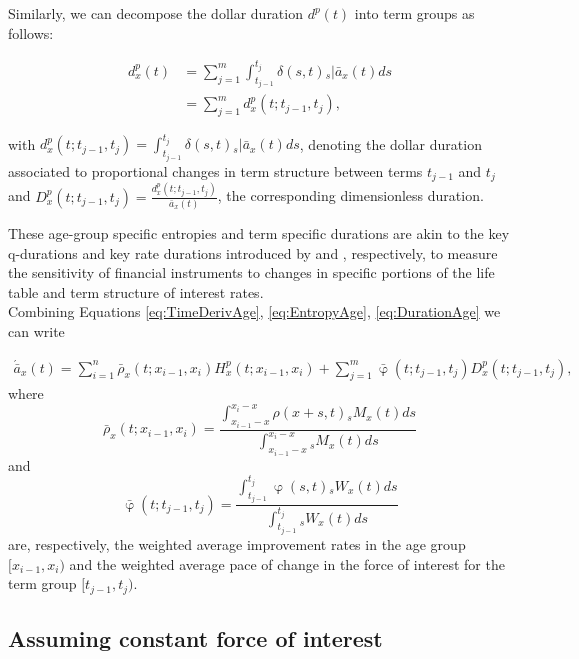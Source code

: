 \documentclass[12pt]{article}
\begin{document}
Similarly, we can decompose the dollar duration $d^p(t)$ into term groups as follows:

\begin{equation}\label{eq:DurationAge}
\begin{split}
{d}^{p}_{x}(t) &= \sum_{j=1}^m\int_{t_{j-1}}^{t_j} \delta(s,t) {}_s|\bar{a}_x(t)ds \\
&= \sum_{j=1}^m {d}^{p}_{x}(t;t_{j-1},t_{j}),
\end{split}
\end{equation}

with ${d}^{p}_{x}(t;t_{j-1},t_{j}) = \int_{t_{j-1}}^{t_j} \delta(s,t) {}_s|\bar{a}_x(t)ds$, denoting the dollar duration associated to proportional changes in term structure between terms $t_{j-1}$ and $t_{j}$ and ${D}^{p}_{x}(t;t_{j-1},t_{j}) = \frac{{d}^{p}_{x}(t;t_{j-1},t_{j})}{\bar{a}_x(t)}$, the corresponding dimensionless duration. 

These age-group specific entropies and term specific durations are akin to the key q-durations and key rate durations introduced by \citep{li2012key} and \citep{Ho1992}, respectively, to measure the sensitivity of financial instruments to changes in specific portions of the life table and term structure of interest rates.\\

Combining Equations \ref{eq:TimeDerivAge}, \ref{eq:EntropyAge}, \ref{eq:DurationAge} we can write  

\begin{equation}\label{eq:TimeDerivAge2}
\begin{split}
 \acute{\bar{a}}_x(t) = \sum_{i=1}^n\bar{\rho}_x(t;x_{i-1}, x_i){H}^{p}_x(t;x_{i-1}, x_i) +\sum_{j=1}^m\bar{\upvarphi}(t;t_{j-1},t_{j}){D}^{p}_x(t;t_{j-1},t_{j}),  
\end{split}
\end{equation}
where $$\bar{\rho}_x(t;x_{i-1}, x_i)= \frac{\int_{x_{i-1}-x}^{x_i-x} \rho(x+s,t) {}_sM_x(t)  ds}{\int_{x_{i-1}-x}^{x_i-x}  {}_sM_x(t)ds}$$ and 
$$\bar{\upvarphi}(t;t_{j-1},t_{j})= \frac{\int_{t_{j-1}}^{t_{j}} \upvarphi(s,t) {}_sW_x(t)  ds}{\int_{t_{j-1}}^{t_{j}} {}_sW_x(t) ds}$$ are, respectively, the weighted average improvement rates in the age group $[x_{i-1},x_{i})$ and the weighted average pace of change in the force of interest for the term group $[t_{j-1},t_{j})$. 



\subsection{Assuming constant force of interest}
\end{document}
